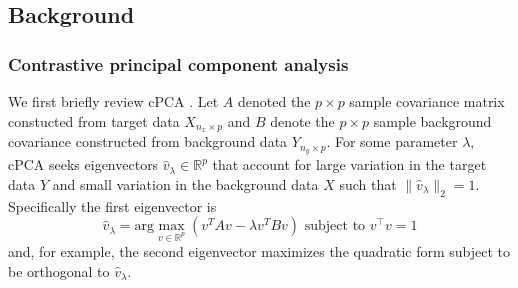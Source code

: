 \documentclass[12pt]{article}
\begin{document}
\subsection{Background\label{sec:background}}
\subsubsection{Contrastive principal component analysis }
We first briefly review cPCA \cite{Abid}. Let $A$ denoted the $p\times p$ sample covariance matrix constucted from target data $X_{n_x \times p}$ and $B$ denote the $p\times p$ sample background covariance constructed from background data $Y_{n_y \times p}$. For some parameter $\lambda$, cPCA seeks eigenvectors $\hat{v}_\lambda \in \mathbb{R}^p$ that account for large variation in the target data $Y$ and small variation in the background data $X$ such that $\|\hat{v}_\lambda\|_2 = 1$. Specifically the first eigenvector is
\begin{equation}
  \label{eq:cpca}
  \hat{v}_\lambda = \text{arg}\max_{v \in \mathbb{R}^p}{\left(v^TAv - \lambda v^TBv\right)} \mbox{ subject to } v^\top  v = 1 
\end{equation}
and, for example, the second eigenvector maximizes the quadratic form subject to be orthogonal to $\hat{v}_\lambda$.
\end{document}
